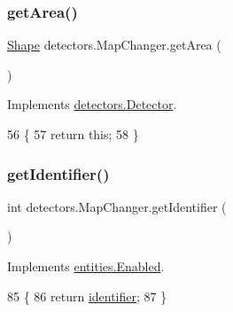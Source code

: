 \subsubsection{\texorpdfstring{get\+Area()}{getArea()}}
{\footnotesize\ttfamily \mbox{\hyperlink{classorg_1_1newdawn_1_1slick_1_1geom_1_1_shape}{Shape}} detectors.\+Map\+Changer.\+get\+Area (\begin{DoxyParamCaption}{ }\end{DoxyParamCaption})\hspace{0.3cm}{\ttfamily [inline]}}



Implements \mbox{\hyperlink{interfacedetectors_1_1_detector_a0b2ecb13c6db0ff6a02e57c193bcf8b2}{detectors.\+Detector}}.


\begin{DoxyCode}
56                            \{
57         \textcolor{keywordflow}{return} \textcolor{keyword}{this};
58     \}
\end{DoxyCode}
\mbox{\label{classdetectors_1_1_map_changer_af5ecc9f5fa80c769ace0b1e623d9f431}} 
\subsubsection{\texorpdfstring{get\+Identifier()}{getIdentifier()}}
{\footnotesize\ttfamily int detectors.\+Map\+Changer.\+get\+Identifier (\begin{DoxyParamCaption}{ }\end{DoxyParamCaption})\hspace{0.3cm}{\ttfamily [inline]}}



Implements \mbox{\hyperlink{interfaceentities_1_1_enabled_afbf595b80729c70944d508375ea7a5fd}{entities.\+Enabled}}.


\begin{DoxyCode}
85                                \{
86         \textcolor{keywordflow}{return} \mbox{\hyperlink{classdetectors_1_1_map_changer_a4c880379dc5b9cdd0c11d388ed7d28ca}{identifier}};
87     \}
\end{DoxyCode}
\mbox{\label{classdetectors_1_1_map_changer_a4d7a3d7511cffb43d1bcf866927a7c12}} 
